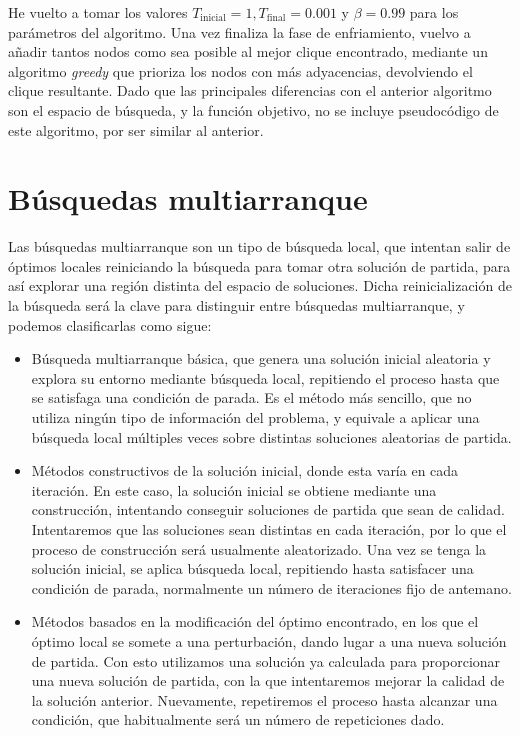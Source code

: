 He vuelto a tomar los valores $T_{\text{inicial}} = 1, T_{\text{final}} = 0.001$ y
$\beta = 0.99$ para los parámetros del algoritmo. Una vez finaliza la fase de enfriamiento,
vuelvo a añadir tantos nodos como sea posible al mejor clique encontrado, mediante un algoritmo
\textit{greedy} que prioriza los nodos con más adyacencias, devolviendo el clique resultante.
Dado que las principales diferencias con el anterior algoritmo son el espacio de búsqueda,
y la función objetivo, no se incluye pseudocódigo de este algoritmo, por ser similar al anterior.

\section{Búsquedas multiarranque}

Las búsquedas multiarranque son un tipo de búsqueda local, que intentan salir de óptimos
locales reiniciando la búsqueda para tomar otra solución de partida, para así explorar
una región distinta del espacio de soluciones. Dicha reinicialización de la búsqueda será
la clave para distinguir entre búsquedas multiarranque, y podemos clasificarlas como sigue:

\begin{itemize}
  \item Búsqueda multiarranque básica, que genera una solución inicial aleatoria y explora su entorno
        mediante búsqueda local, repitiendo el proceso hasta que se satisfaga una condición de parada.
        Es el método más sencillo, que no utiliza ningún tipo de información del problema, y equivale
        a aplicar una búsqueda local múltiples veces sobre distintas soluciones aleatorias de partida.

  \item Métodos constructivos de la solución inicial, donde esta varía en cada iteración. En este caso,
        la solución inicial se obtiene mediante una construcción, intentando conseguir soluciones de
        partida que sean de calidad. Intentaremos que las soluciones sean distintas en cada iteración,
        por lo que el proceso de construcción será usualmente aleatorizado. Una vez se tenga la solución
        inicial, se aplica búsqueda local, repitiendo hasta satisfacer una condición de parada,
        normalmente un número de iteraciones fijo de antemano.

  \item Métodos basados en la modificación del óptimo encontrado, en los que el óptimo local se somete
        a una perturbación, dando lugar a una nueva solución de partida. Con esto utilizamos una
        solución ya calculada para proporcionar una nueva solución de partida, con la que intentaremos
        mejorar la calidad de la solución anterior. Nuevamente, repetiremos el proceso hasta alcanzar
        una condición, que habitualmente será un número de repeticiones dado.
\end{itemize}

